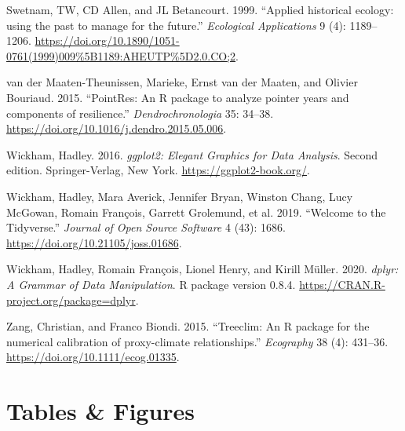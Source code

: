 \documentclass[review]{elsarticle} %
\begin{document}
\leavevmode\hypertarget{ref-Swetnam1999}{}%
Swetnam, TW, CD Allen, and JL Betancourt. 1999. ``Applied historical ecology: using the past to manage for the future.'' \emph{Ecological Applications} 9 (4): 1189--1206. \url{https://doi.org/10.1890/1051-0761(1999)009\%5B1189:AHEUTP\%5D2.0.CO;2}.

\leavevmode\hypertarget{ref-VanderMaaten-Theunissen2015}{}%
van der Maaten-Theunissen, Marieke, Ernst van der Maaten, and Olivier Bouriaud. 2015. ``PointRes: An R package to analyze pointer years and components of resilience.'' \emph{Dendrochronologia} 35: 34--38. \url{https://doi.org/10.1016/j.dendro.2015.05.006}.

\leavevmode\hypertarget{ref-wickham2016ggplot2}{}%
Wickham, Hadley. 2016. \emph{ggplot2: Elegant Graphics for Data Analysis}. Second edition. Springer-Verlag, New York. \url{https://ggplot2-book.org/}.

\leavevmode\hypertarget{ref-Wickham2019}{}%
Wickham, Hadley, Mara Averick, Jennifer Bryan, Winston Chang, Lucy McGowan, Romain François, Garrett Grolemund, et al. 2019. ``Welcome to the Tidyverse.'' \emph{Journal of Open Source Software} 4 (43): 1686. \url{https://doi.org/10.21105/joss.01686}.

\leavevmode\hypertarget{ref-Wickham2020dplyr}{}%
Wickham, Hadley, Romain François, Lionel Henry, and Kirill Müller. 2020. \emph{dplyr: A Grammar of Data Manipulation}. R package version 0.8.4. \url{https://CRAN.R-project.org/package=dplyr}.

\leavevmode\hypertarget{ref-Zang2015}{}%
Zang, Christian, and Franco Biondi. 2015. ``Treeclim: An R package for the numerical calibration of proxy-climate relationships.'' \emph{Ecography} 38 (4): 431--36. \url{https://doi.org/10.1111/ecog.01335}.

\newpage

\hypertarget{tables-figures}{%
\section*{Tables \& Figures}\label{tables-figures}}
\end{document}
